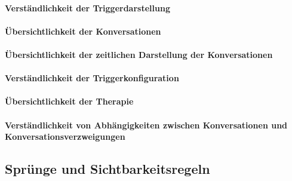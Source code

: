 %


\paragraph{Verständlichkeit der Triggerdarstellung}
\paragraph{Übersichtlichkeit der Konversationen}
\paragraph{Übersichtlichkeit der zeitlichen Darstellung der Konversationen}
\paragraph{Verständlichkeit der Triggerkonfiguration}
\paragraph{Übersichtlichkeit der Therapie}
\paragraph{Verständlichkeit von Abhängigkeiten zwischen Konversationen und Konversationsverzweigungen}




\subsection{Sprünge und Sichtbarkeitsregeln}

